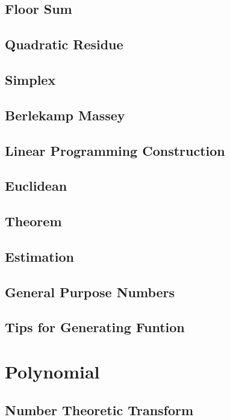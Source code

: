 \subsection{Floor Sum}

\subsection{Quadratic Residue}

\subsection{Simplex}

\subsection{Berlekamp Massey}

\subsection{Linear Programming Construction}

\subsection{Euclidean}

\subsection{Theorem}

\subsection{Estimation}

\subsection{General Purpose Numbers}

\subsection{Tips for Generating Funtion}


\section{Polynomial}
\subsection{Number Theoretic Transform}

